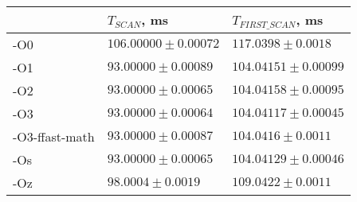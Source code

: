 \begin{tabular}{lll}
\toprule
 & $T_{SCAN}$, ms & $T_{FIRST\_SCAN}$, ms \\
\midrule
-O0 & $106.00000 \pm 0.00072$ & $117.0398 \pm 0.0018$ \\
-O1 & $93.00000 \pm 0.00089$ & $104.04151 \pm 0.00099$ \\
-O2 & $93.00000 \pm 0.00065$ & $104.04158 \pm 0.00095$ \\
-O3 & $93.00000 \pm 0.00064$ & $104.04117 \pm 0.00045$ \\
-O3-ffast-math & $93.00000 \pm 0.00087$ & $104.0416 \pm 0.0011$ \\
-Os & $93.00000 \pm 0.00065$ & $104.04129 \pm 0.00046$ \\
-Oz & $98.0004 \pm 0.0019$ & $109.0422 \pm 0.0011$ \\
\bottomrule
\end{tabular}
